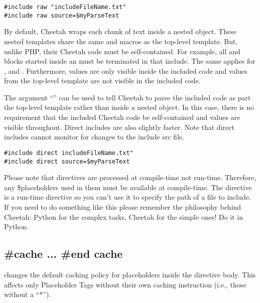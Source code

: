\begin{verbatim}
#include raw "includeFileName.txt"
#include raw source=$myParseText
\end{verbatim}

By default, Cheetah wraps each chunk of  text inside a nested
 object.  These nested templates share the same 
and macros as the top-level template. But, unlike PHP, their Cheetah code must be
self-contained.  For example, all  and  blocks started
inside an  must be terminated in that include.  The same applies
for ,  and .  Furthermore, 
values are only visible inside the included code and  values from
the top-level template are not visible in the included code.

The argument ``'' can be used to tell Cheetah to parse the included
code as part the top-level template rather than inside a nested 
object.  In this case, there is no requirement that the included Cheetah code be
self-contained and  values are visible throughout.  Direct includes
are also slightly faster.  Note that direct includes cannot monitor for changes
to the include src file.

\begin{verbatim}
#include direct includeFileName.txt"
#include direct source=$myParseText
\end{verbatim}

Please note that  directives are processed at compile-time not
run-time.  Therefore, any \$placeholders used in them must be available at
compile-time.  The  directive is a run-time directive so you can't
use it to specify the path of a file to include.  If you need to do something
like this please remember the philosophy behind Cheetah: Python for the complex
tasks, Cheetah for the simple ones!  Do it in Python.

\subsection{\#cache ... \#end cache}
\label{directives.cache}

 changes the default caching policy for placeholders inside the
directive body.  This affects only Placeholder Tags without their own caching
instruction (i.e., those without a ``*'').

